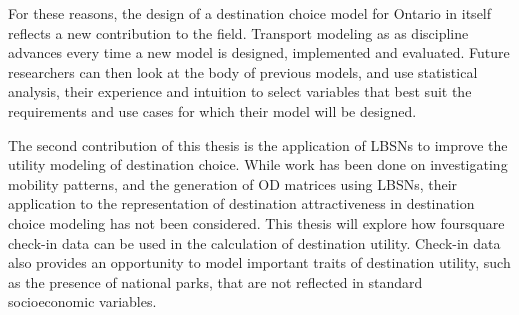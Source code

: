 For these reasons, the design of a destination choice model for Ontario in itself reflects a new contribution to the field.  Transport modeling as as discipline advances every time a new model is designed, implemented and evaluated. Future researchers can then look at the body of previous models, and use statistical analysis, their experience and intuition to select variables that best suit the requirements and use cases for which their model will be designed. 

The second contribution of this thesis is the application of LBSNs to improve the utility modeling of destination choice. While work has been done on investigating mobility patterns, and the generation of OD matrices using LBSNs, their application to the representation of destination attractiveness in destination choice modeling has not been considered. This thesis will explore how foursquare check-in data can be used in the calculation of destination utility. Check-in data also provides an opportunity to model important traits of destination utility, such as the presence of national parks, that are not reflected in standard socioeconomic variables.


